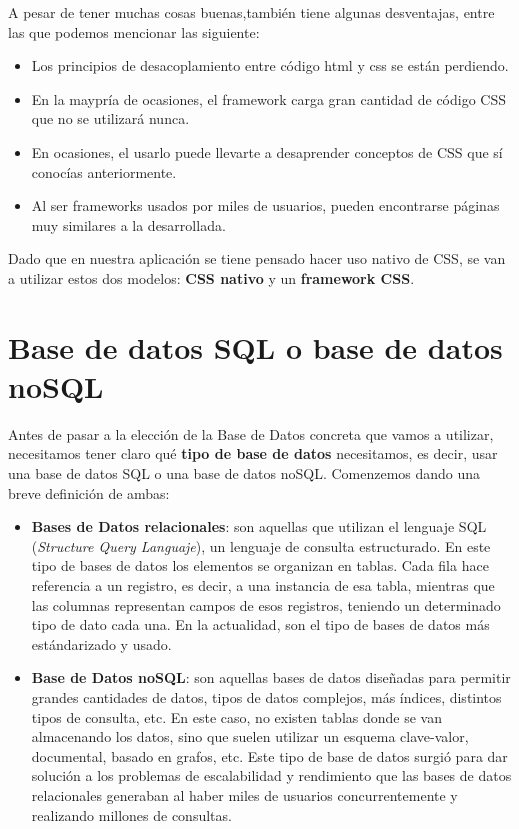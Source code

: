 A pesar de tener muchas cosas buenas,también tiene algunas desventajas, entre las que
podemos mencionar las siguiente:

    \begin{itemize}
        \item Los principios de desacoplamiento entre código html y css se están perdiendo.
        \item En la maypría de ocasiones, el framework carga gran cantidad de código CSS
        que no se utilizará nunca.
        \item En ocasiones, el usarlo puede llevarte a desaprender conceptos de CSS que sí
        conocías anteriormente.
        \item Al ser frameworks usados por miles de usuarios, pueden encontrarse páginas
        muy similares a la desarrollada.
    \end{itemize}

Dado que en nuestra aplicación se tiene pensado hacer uso nativo de CSS, se van a
utilizar estos dos modelos: \textbf{CSS nativo} y un \textbf{framework CSS}.

\section{Base de datos SQL o base de datos noSQL} \label{sec:sql-nosql}
Antes de pasar a la elección de la Base de Datos concreta que vamos a utilizar, necesitamos
tener claro qué \textbf{tipo de base de datos} necesitamos, es decir, usar una base de datos
SQL o una base de datos noSQL. Comenzemos dando una breve definición de ambas:
    
    \begin{itemize}
        \item \textbf{Bases de Datos relacionales}: son aquellas que utilizan el lenguaje SQL
        (\textit{Structure Query Languaje}), un lenguaje de consulta estructurado. En este tipo
        de bases de datos los elementos se organizan en tablas. Cada fila hace referencia a un
        registro, es decir, a una instancia de esa tabla, mientras que las columnas representan
        campos de esos registros, teniendo un determinado tipo de dato cada una. En la
        actualidad, son el tipo de bases de datos más estándarizado y usado.
        \item \textbf{Base de Datos noSQL}: son aquellas bases de datos diseñadas para
        permitir grandes cantidades de datos, tipos de datos complejos, más índices,
        distintos tipos de consulta, etc. En este caso, no existen tablas donde se van
        almacenando los datos, sino que suelen utilizar un esquema clave-valor, documental,
        basado en grafos, etc. Este tipo de base de datos surgió para dar solución a los
        problemas de escalabilidad y rendimiento que las bases de datos relacionales
        generaban al haber miles de usuarios concurrentemente y realizando millones de
        consultas.
    \end{itemize}

